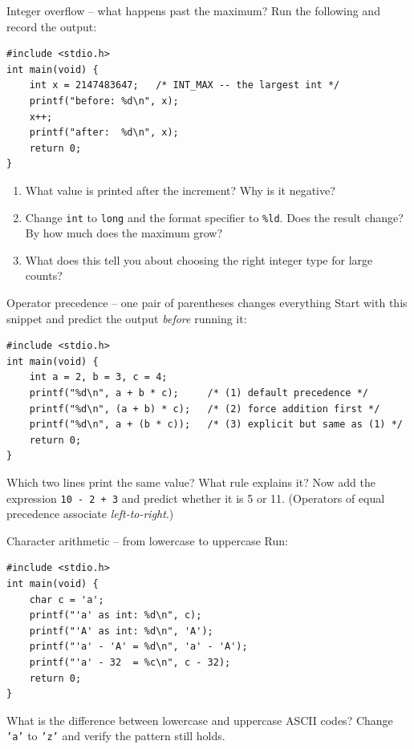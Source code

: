 \documentclass[11pt]{article}
\begin{document}
\begin{tryit}{Integer overflow -- what happens past the maximum?}
Run the following and record the output:
\begin{lstlisting}
#include <stdio.h>
int main(void) {
    int x = 2147483647;   /* INT_MAX -- the largest int */
    printf("before: %d\n", x);
    x++;
    printf("after:  %d\n", x);
    return 0;
}
\end{lstlisting}
\begin{enumerate}[nosep,leftmargin=*]
  \item What value is printed after the increment? Why is it negative?
  \item Change \texttt{int} to \texttt{long} and the format specifier to \texttt{\%ld}.
        Does the result change? By how much does the maximum grow?
  \item What does this tell you about choosing the right integer type for large counts?
\end{enumerate}
\end{tryit}

\begin{tryit}{Operator precedence -- one pair of parentheses changes everything}
Start with this snippet and predict the output \emph{before} running it:
\begin{lstlisting}
#include <stdio.h>
int main(void) {
    int a = 2, b = 3, c = 4;
    printf("%d\n", a + b * c);     /* (1) default precedence */
    printf("%d\n", (a + b) * c);   /* (2) force addition first */
    printf("%d\n", a + (b * c));   /* (3) explicit but same as (1) */
    return 0;
}
\end{lstlisting}
Which two lines print the same value? What rule explains it?
Now add the expression \texttt{10 - 2 + 3} and predict whether it is 5 or 11.
(Operators of equal precedence associate \emph{left-to-right}.)
\end{tryit}

\begin{tryit}{Character arithmetic -- from lowercase to uppercase}
Run:
\begin{lstlisting}
#include <stdio.h>
int main(void) {
    char c = 'a';
    printf("'a' as int: %d\n", c);
    printf("'A' as int: %d\n", 'A');
    printf("'a' - 'A' = %d\n", 'a' - 'A');
    printf("'a' - 32  = %c\n", c - 32);
    return 0;
}
\end{lstlisting}
What is the difference between lowercase and uppercase ASCII codes?
Change \texttt{'a'} to \texttt{'z'} and verify the pattern still holds.
\end{tryit}
\end{document}
